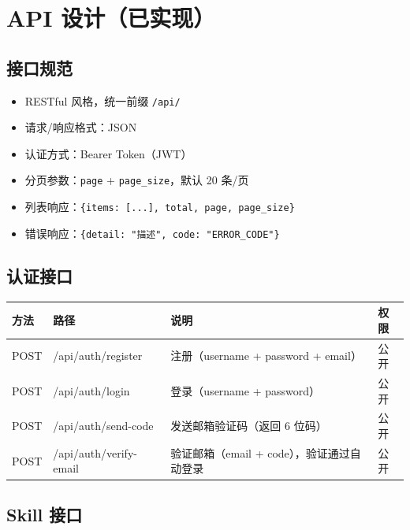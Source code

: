 \documentclass[11pt,a4paper]{article}
\begin{document}
\section{API 设计（已实现）}

\subsection{接口规范}

\begin{itemize}[nosep]
  \item RESTful 风格，统一前缀 \texttt{/api/}
  \item 请求/响应格式：JSON
  \item 认证方式：Bearer Token（JWT）
  \item 分页参数：\texttt{page} + \texttt{page\_size}，默认 20 条/页
  \item 列表响应：\texttt{\{items: [...], total, page, page\_size\}}
  \item 错误响应：\texttt{\{detail: "描述", code: "ERROR\_CODE"\}}
\end{itemize}

\subsection{认证接口}

\begin{table}[h]
\centering
\begin{tabularx}{\linewidth}{lllX}
\toprule
\textbf{方法} & \textbf{路径} & \textbf{说明} & \textbf{权限} \\
\midrule
POST & /api/auth/register & 注册（username + password + email） & 公开 \\
POST & /api/auth/login & 登录（username + password） & 公开 \\
POST & /api/auth/send-code & 发送邮箱验证码（返回 6 位码） & 公开 \\
POST & /api/auth/verify-email & 验证邮箱（email + code），验证通过自动登录 & 公开 \\
\bottomrule
\end{tabularx}
\end{table}

\subsection{Skill 接口}
\end{document}
